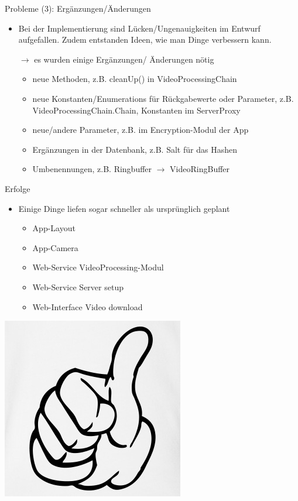 \documentclass[19pt]{beamer}
\begin{document}
\begin{frame}{Probleme (3): Ergänzungen/Änderungen}
	\begin{itemize}
		\item Bei der Implementierung sind Lücken/Ungenauigkeiten im Entwurf aufgefallen. Zudem entstanden Ideen, wie man Dinge verbessern kann.
		\pause
		\item[$\rightarrow$] es wurden einige Ergänzungen/ Änderungen nötig
		\pause
		\begin{itemize}
			\item neue Methoden, z.B. cleanUp() in VideoProcessingChain
			\pause
			\item neue Konstanten/Enumerations für Rückgabewerte oder Parameter, z.B. VideoProcessingChain.Chain, Konstanten im ServerProxy
			\item neue/andere Parameter, z.B. im Encryption-Modul der App
			\pause
			\item Ergänzungen in der Datenbank, z.B. Salt für das Hashen
			\pause
			\item Umbenennungen, z.B. Ringbuffer $\rightarrow$ VideoRingBuffer
		\end{itemize}
	\end{itemize}
\end{frame}

\begin{frame}{Erfolge}
	\begin{itemize}
		\item Einige Dinge liefen sogar schneller als ursprünglich geplant
		\pause
		\begin{itemize}
			\item App-Layout
			\pause
			\item App-Camera
			\pause
			\item Web-Service VideoProcessing-Modul
			\pause
			\item Web-Service Server setup
			\pause
			\item Web-Interface Video download
		\end{itemize}
	\end{itemize}
	\includegraphics[scale=0.2,right]{resources/Daumen.jpg}
\end{frame}
\end{document}
